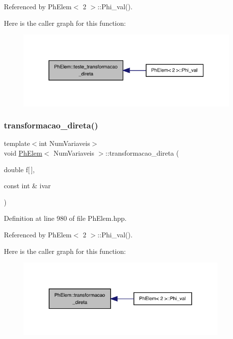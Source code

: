 Referenced by Ph\+Elem$<$ 2 $>$\+::\+Phi\+\_\+val().

Here is the caller graph for this function\+:
\nopagebreak
\begin{figure}[H]
\begin{center}
\leavevmode
\includegraphics[width=320pt]{classPhElem_a68e2ff863aa38d90933fc033e1fcec0e_icgraph}
\end{center}
\end{figure}
\mbox{\label{classPhElem_a09b6787e5e42496ece86754bbb2ae59c}} 
\subsubsection{\texorpdfstring{transformacao\+\_\+direta()}{transformacao\_direta()}}
{\footnotesize\ttfamily template$<$int Num\+Variaveis$>$ \\
void \hyperlink{classPhElem}{Ph\+Elem}$<$ Num\+Variaveis $>$\+::transformacao\+\_\+direta (\begin{DoxyParamCaption}\item[{double}]{f\mbox{[}$\,$\mbox{]},  }\item[{const int \&}]{ivar }\end{DoxyParamCaption})}



Definition at line 980 of file Ph\+Elem.\+hpp.



Referenced by Ph\+Elem$<$ 2 $>$\+::\+Phi\+\_\+val().

Here is the caller graph for this function\+:
\nopagebreak
\begin{figure}[H]
\begin{center}
\leavevmode
\includegraphics[width=300pt]{classPhElem_a09b6787e5e42496ece86754bbb2ae59c_icgraph}
\end{center}
\end{figure}
\mbox{\label{classPhElem_a4ea6c54e35eb46d331db770f992c4c4b}} 
